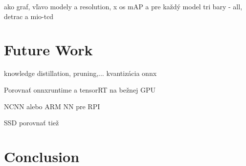 ako graf, vľavo modely a resolution, x os mAP a pre každý model tri bary - all, detrac a mio-tcd







\chapter{Future Work}

knowledge distillation, pruning,... kvantizácia onnx

Porovnať onnxruntime a tensorRT na bežnej GPU

NCNN alebo ARM NN pre RPI

SSD porovnať tiež



\chapter{Conclusion}













